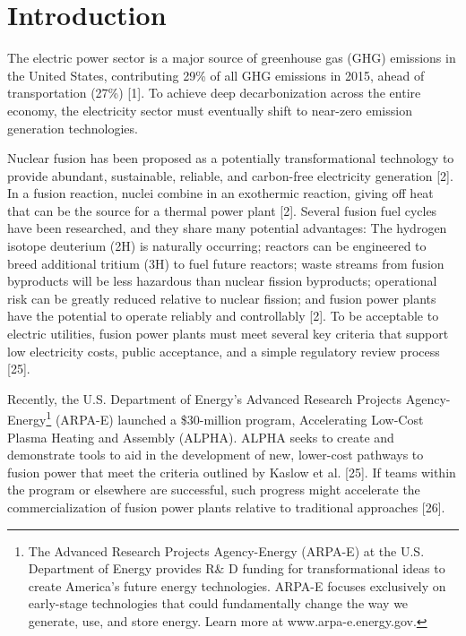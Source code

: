 \documentclass[preprint, 12pt]{elsarticle}
\begin{document}
\section{Introduction}

The electric power sector is a major source of greenhouse gas (GHG) emissions in the United States, contributing 29\% of all GHG emissions in 2015, ahead of transportation (27\%) [1]. To achieve deep decarbonization across the entire economy, the electricity sector must eventually shift to near-zero emission generation technologies.

Nuclear fusion has been proposed as a potentially transformational technology to provide abundant, sustainable, reliable, and carbon-free electricity generation [2]. In a fusion reaction, nuclei combine in an exothermic reaction, giving off heat that can be the source for a thermal power plant [2]. Several fusion fuel cycles have been researched, and they share many potential advantages: The hydrogen isotope deuterium (2H) is naturally occurring; reactors can be engineered to breed additional tritium (3H) to fuel future reactors; waste streams from fusion byproducts will be less hazardous than nuclear fission byproducts; operational risk can be greatly reduced relative to nuclear fission; and fusion power plants have the potential to operate reliably and controllably [2]. To be acceptable to electric utilities, fusion power plants must meet several key criteria that support low electricity costs, public acceptance, and a simple regulatory review process [25].

Recently, the U.S. Department of Energy's Advanced Research Projects Agency-Energy\footnote{The Advanced Research Projects Agency-Energy (ARPA-E) at the U.S. Department of Energy provides R\& D funding for transformational ideas to create America’s future energy technologies. ARPA-E focuses exclusively on early-stage technologies that could fundamentally change the way we generate, use, and store energy. Learn more at www.arpa-e.energy.gov.} (ARPA-E) launched a \$30-million program, Accelerating Low-Cost Plasma Heating and Assembly (ALPHA). ALPHA seeks to create and demonstrate tools to aid in the development of new, lower-cost pathways to fusion power that meet the criteria outlined by Kaslow et al. [25]. If teams within the program or elsewhere are successful, such progress might accelerate the commercialization of fusion power plants relative to traditional approaches [26].
\end{document}
